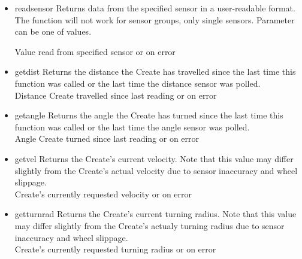\documentclass {article}
\begin{document}
\begin {itemize}
\item {} {readsensor} Returns
  data from the specified sensor in a user-readable format.  The
  function will not
  work for sensor groups, only single sensors.  Parameter can be one of \oisensor values. \\
  \ret Value read from specified sensor or \fail on error

\item {} {getdist} Returns the distance the
  Create has travelled since the last time this function was called
  or the last time the distance sensor was polled. \\
  \ret Distance Create travelled since last reading or \fail on error

\item {} {getangle} Returns the angle the
  Create has turned since the last time this function was called or
  the
  last time the angle sensor was polled. \\
  \ret Angle Create turned since last reading or \fail on error

\item {} {getvel} Returns the Create's
  current velocity.  Note that this value may differ slightly from the
  Create's actual velocity due to sensor inaccuracy and wheel slippage. \\
  \ret Create's currently requested velocity or \fail on error

\item {} {getturnrad} Returns the
  Create's current turning radius.  Note that this value may differ
  slightly from
  the Create's actualy turning radius due to sensor inaccuracy and wheel slippage. \\
  \ret Create's currently requested turning radius or \fail on error


\end{itemize}
\end{document}
